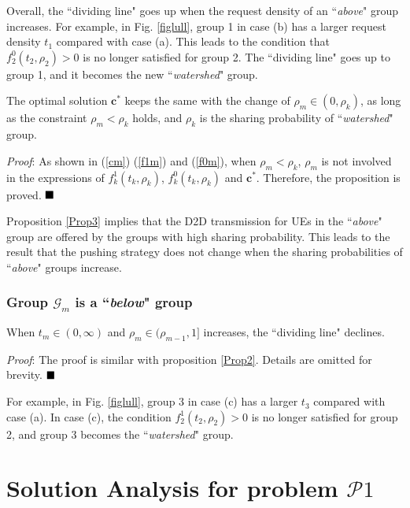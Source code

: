 \documentclass[12pt, draftclsnofoot, onecolumn]{IEEEtran}
\begin{document}
Overall,  the ``dividing line" goes up when the request density of an ``\textit{above}" group increases.
For example, in Fig. \ref{figlull}, group 1 in case (b) has a larger request density $t_1$ compared with case (a). This leads to the condition that $f^0_2(t_2, \rho_2)>0$ is no longer satisfied for group 2. The ``dividing line" goes up to group 1, and it becomes the new ``\textit{watershed}"  group.

\begin{proposition}\label{Prop3}
The optimal solution $\bm{c}^{\ast}$ keeps the same with the change of $\rho_m \in (0, \rho_{k})$, as long as the constraint $\rho_m< \rho_{k}$ holds, and $\rho_{k}$ is the sharing probability of ``\textit{watershed}" group.
\end{proposition}
\textit{Proof}: As shown in (\ref{cm}) (\ref{f1m}) and (\ref{f0m}), when $\rho_m< \rho_{k}$, $\rho_m$ is not involved in the expressions of $f^1_k(t_k, \rho_k)$, $f^0_k(t_k, \rho_k)$ and $\bm{c}^{\ast}$. Therefore, the proposition is proved.
$\hfill\blacksquare$

Proposition \ref{Prop3} implies that the D2D transmission for UEs in the ``\textit{above}" group are offered by the groups with high sharing probability. This leads to the result that the pushing strategy does not change when the sharing probabilities of ``\textit{above}" groups increase.

\subsubsection{Group $\mathcal{G}_{m}$ is a ``\textit{below}" group}
\begin{proposition}\label{Prop4}
When $t_m \in (0, \infty) $ and $\rho_m\!\! \in (\rho_{m-1}, 1]$ increases, the ``dividing line" declines.
\end{proposition}
\textit{Proof}: The proof is similar with proposition \ref{Prop2}. Details are omitted for brevity. $\hfill\blacksquare$

For example, in Fig. \ref{figlull}, group 3 in case (c) has a larger $t_3$ compared with case (a). In case (c), the condition $f^1_2(t_2, \rho_2)>0$ is no longer satisfied for group 2, and group 3 becomes the ``\textit{watershed}"  group.

\section{Solution Analysis for problem $\mathcal{P}1$}
\end{document}
